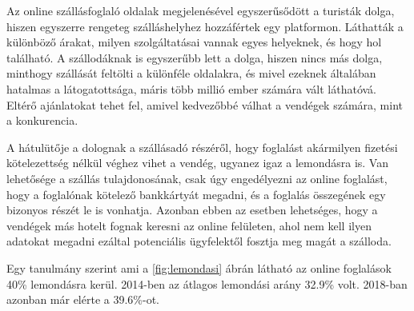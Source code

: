 

Az online szállásfoglaló oldalak megjelenésével egyszerűsődött a turisták dolga, hiszen egyszerre rengeteg szálláshelyhez hozzáfértek egy platformon. Láthatták a különböző árakat, milyen szolgáltatásai vannak egyes helyeknek, és hogy hol található. A szállodáknak is egyszerűbb lett a dolga, hiszen nincs más dolga, minthogy szállását feltölti a különféle oldalakra, és mivel ezeknek általában hatalmas a látogatottsága, máris több millió ember számára vált láthatóvá. Eltérő ajánlatokat tehet fel, amivel kedvezőbbé válhat a vendégek számára, mint a konkurencia.

A hátulütője a dolognak a szállásadó részéről, hogy foglalást akármilyen fizetési kötelezettség nélkül véghez vihet a vendég, ugyanez igaz a lemondásra is. Van lehetősége a szállás tulajdonosának, csak úgy engedélyezni az online foglalást, hogy a foglalónak kötelező bankkártyát megadni, és a foglalás összegének egy bizonyos részét le is vonhatja. Azonban ebben az esetben lehetséges, hogy a vendégek más hotelt fognak keresni az online felületen, ahol nem kell ilyen adatokat megadni ezáltal potenciális ügyfelektől fosztja meg magát a szálloda.

Egy tanulmány szerint ami a \ref{fig:lemondasi}\cite{online_lemondas} ábrán látható az online foglalások 40\% lemondásra kerül. 2014-ben az átlagos lemondási arány 32.9\% volt. 2018-ban azonban már elérte a 39.6\%-ot\cite{online_lemondas}.

